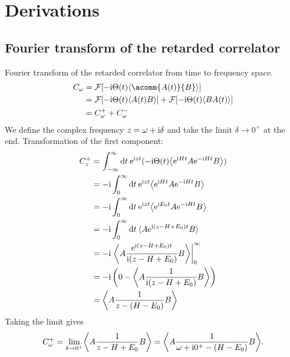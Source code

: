 
\chapter{Derivations}

\section{Fourier transform of the retarded correlator}%
\label{app:fourier-transform}

Fourier transform of the retarded correlator from time to frequency space.
\begin{align}
    C_\omega
     & =
    \mathcal{F}[-\mi \Theta(t) \expval{\acomm{A(t)}{B}}] \\
     & =
    \mathcal{F}[-\mi \Theta(t) \expval{A(t) B}]
    +
    \mathcal{F}[-\mi \Theta(t) \expval{B A(t)}]          \\
     & =
    C^+_\omega + C^-_\omega
\end{align}
We define the complex frequency $z=\omega+\mathrm{i}\delta$ and take the limit $\delta\to0^+$ at the end.
Transformation of the first component:
\begin{align}
    C^+_z
     & =
    \int_{-\infty}^\infty \md t \>
    \me^{\mi zt}(-\mi \Theta(t) \expval*{\me^{\mi Ht} A \me^{-\mi Ht} B}) \\
     & =
    -\mi \int_0^\infty \md t \>
    \me^{\mi zt} \expval*{\me^{\mi Ht} A \me^{-\mi Ht} B}                 \\
     & =
    -\mi \int_0^\infty \md t \>
    \me^{\mi zt} \expval*{\me^{\mi E_0t} A \me^{-\mi Ht} B}               \\
     & =
    -\mi \int_0^\infty \md t \>
    \expval{A \me^{\mi(z - H + E_0)t} B}                                  \\
     & =
    -\mi \left.\expval*{A \frac{\me^{\mi(z - H + E_0)t}}{\mi(z - H + E_0)} B}
    \right|_0^\infty                                                      \\
     & =
    -\mi \left(0 - \expval*{A \frac{1}{\mi(z - H + E_0)} B}\right)        \\
     & =
    \expval*{A \frac{1}{z - (H - E_0)} B}
\end{align}
Taking the limit gives
\begin{equation}
    C^+_\omega
    =
    \lim_{\delta\to0^+} \expval*{A \frac{1}{z - H + E_0} B}
    =
    \expval*{A \frac{1}{\omega + \mi0^+ - (H - E_0)} B}.
\end{equation}
